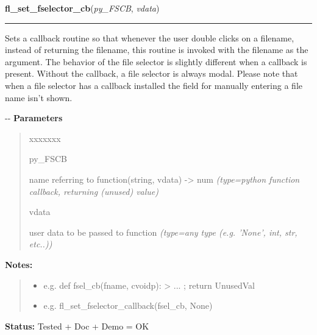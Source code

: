     \label{xformslib:flgoodies:fl_set_fselector_callback}

    \vspace{0.5ex}

\hspace{.8\funcindent}\begin{boxedminipage}{\funcwidth}

    \raggedright \textbf{fl\_set\_fselector\_cb}(\textit{py\_FSCB}, \textit{vdata})

    \vspace{-1.5ex}

    \rule{\textwidth}{0.5\fboxrule}
\setlength{\parskip}{2ex}

Sets a callback routine so that whenever the user double clicks on a
filename, instead of returning the filename, this routine is invoked with
the filename as the argument. The behavior of the file selector is
slightly different when a callback is present. Without the callback, a
file selector is always modal. Please note that when a file selector has
a callback installed the field for manually entering a file name isn't
shown.

-{}-
\setlength{\parskip}{1ex}
      \textbf{Parameters}
      \vspace{-1ex}

      \begin{quote}
        \begin{Ventry}{xxxxxxx}

          \item[py\_FSCB]


name referring to function(string, vdata) -> num
            {\it (type=python function callback, returning (unused) value)}

          \item[vdata]


user data to be passed to function
            {\it (type=any type (e.g. 'None', int, str, etc..))}

        \end{Ventry}

      \end{quote}

\textbf{Notes:}
\begin{quote}
  \begin{itemize}

  \item
    \setlength{\parskip}{0.6ex}

e.g. def fsel\_cb(fname, cvoidp): > ... ; return UnusedVal


  \item 
e.g. fl\_set\_fselector\_callback(fsel\_cb, None)


\end{itemize}

\end{quote}

\textbf{Status:} 
Tested + Doc + Demo = OK


    \end{boxedminipage}

